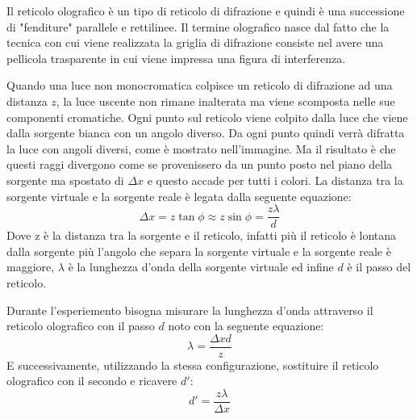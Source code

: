 Il reticolo olografico è un tipo di reticolo di difrazione e quindi è una successione di "fenditure" parallele e rettilinee. Il termine olografico nasce dal fatto che la tecnica con cui viene realizzata la griglia di difrazione consiste nel avere una pellicola trasparente in cui viene impressa una figura di interferenza.

Quando una luce non monocromatica colpisce un reticolo di difrazione ad una distanza $z$, la luce uscente non rimane inalterata ma viene scomposta nelle sue componenti cromatiche. Ogni punto sul reticolo viene colpito dalla luce che viene dalla sorgente bianca con un angolo diverso. Da ogni punto quindi verrà difratta la luce con angoli diversi, come è mostrato nell'immagine. Ma il risultato è che questi raggi divergono come se provenissero da un punto posto nel piano della sorgente ma spostato di $\Delta x$ e questo accade per tutti i colori. La distanza tra la sorgente virtuale e la sorgente reale è legata dalla seguente equazione:
\begin{equation}
    \Delta x= z\tan{\phi}\approx z\sin{\phi}=\frac{z\lambda}{d}
\end{equation}
Dove z è la distanza tra la sorgente e il reticolo, infatti più il reticolo è lontana dalla sorgente più l'angolo che separa la sorgente virtuale e la sorgente reale è maggiore, $\lambda$ è la lunghezza d'onda della sorgente virtuale ed infine $d$ è il passo del reticolo.

Durante l'esperiemento bisogna misurare la lunghezza d'onda attraverso il reticolo olografico con il passo $d$ noto con la seguente equazione:
\begin{equation}
    \lambda=\frac{\Delta x d}{z}
\end{equation}
E successivamente, utilizzando la stessa configurazione, sostituire il reticolo olografico con il secondo e ricavere $d'$:
\begin{equation}
    d'=\frac{z\lambda}{\Delta x}
\end{equation}